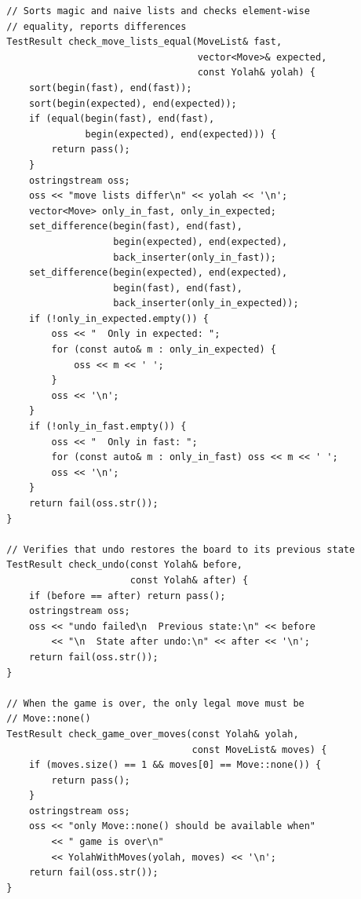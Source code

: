 \documentclass[12pt,a4paper,twoside,openright]{book}
\begin{document}
\begin{mdframed}[skipabove=\baselineskip,topline=false,rightline=false,bottomline=false,leftline=false,linewidth=1pt,linecolor=gray!40,innerleftmargin=8pt]
\begin{verbatim}
        // Sorts magic and naive lists and checks element-wise 
        // equality, reports differences
        TestResult check_move_lists_equal(MoveList& fast, 
                                          vector<Move>& expected, 
                                          const Yolah& yolah) {
            sort(begin(fast), end(fast));
            sort(begin(expected), end(expected));
            if (equal(begin(fast), end(fast), 
                      begin(expected), end(expected))) {
                return pass();
            }
            ostringstream oss;
            oss << "move lists differ\n" << yolah << '\n';
            vector<Move> only_in_fast, only_in_expected;
            set_difference(begin(fast), end(fast), 
                           begin(expected), end(expected), 
                           back_inserter(only_in_fast));
            set_difference(begin(expected), end(expected), 
                           begin(fast), end(fast), 
                           back_inserter(only_in_expected));
            if (!only_in_expected.empty()) {
                oss << "  Only in expected: ";
                for (const auto& m : only_in_expected) {
                    oss << m << ' ';
                }
                oss << '\n';
            }
            if (!only_in_fast.empty()) {
                oss << "  Only in fast: ";
                for (const auto& m : only_in_fast) oss << m << ' ';
                oss << '\n';
            }
            return fail(oss.str());
        }

        // Verifies that undo restores the board to its previous state
        TestResult check_undo(const Yolah& before, 
                              const Yolah& after) {
            if (before == after) return pass();
            ostringstream oss;
            oss << "undo failed\n  Previous state:\n" << before
                << "\n  State after undo:\n" << after << '\n';
            return fail(oss.str());
        }

        // When the game is over, the only legal move must be 
        // Move::none()
        TestResult check_game_over_moves(const Yolah& yolah, 
                                         const MoveList& moves) {
            if (moves.size() == 1 && moves[0] == Move::none()) {
                return pass();
            }
            ostringstream oss;
            oss << "only Move::none() should be available when"
                << " game is over\n"
                << YolahWithMoves(yolah, moves) << '\n';
            return fail(oss.str());
        }


\end{verbatim}
\end{mdframed}
\end{document}
